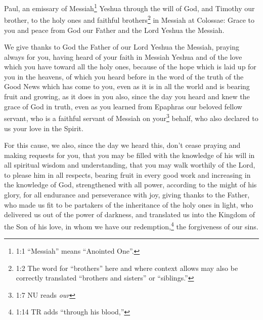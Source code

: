 \newpage
\null
\thispagestyle{empty}
\newpage






\vspace{-1.36in}


\mychapter{} \myverse*{}Paul, an emissary of Messiah\footnote{1:1 “Messiah” means “Anointed One”.} Yeshua through the will of God, and Timothy our brother,
\myverse{}to the holy ones and faithful brothers\footnote{1:2 The word for “brothers” here and where context allows may also be correctly translated “brothers
	and sisters” or “siblings.”} in Messiah at Colossae: Grace to you and peace from God our Father
and the Lord Yeshua the Messiah.

\myverse{}We give thanks to God the Father of our Lord Yeshua the Messiah,
praying always for you,
\myverse{}having heard of your faith in Messiah Yeshua and of the love which you have
toward all the holy ones,
\myverse{}because of the hope which is laid up for you in the heavens, of which you heard
before in the word of the truth of the Good News
\myverse{}which has come to you, even as it is in all the world and is bearing fruit and
growing, as it does in you also, since the day you heard and knew the grace of God in truth,
\myverse{}even as you learned from Epaphras our beloved fellow servant, who is a faithful
servant of Messiah on your\footnote{1:7 NU reads \textit{our}} behalf,
\myverse{}who also declared to us your love in the Spirit.

\myverse{}For this cause, we also, since the day we heard this, don’t cease
praying and making requests for you, that you may be filled with the knowledge of his will in all spiritual
wisdom and understanding,
\myverse{}that you may walk worthily of the Lord, to please him in all respects, bearing
fruit in every good work and increasing in the knowledge of God,
\myverse{}strengthened with all power, according to the might of his glory, for all
endurance and perseverance with joy,
\myverse{}giving thanks to the Father, who made us fit to be partakers of the inheritance
of the holy ones in light,
\myverse{}who delivered us out of the power of darkness, and translated us into the
Kingdom of the Son of his love,
\myverse{}in whom we have our redemption,\footnote{1:14 TR adds “through his blood,”
} the forgiveness of our sins.

